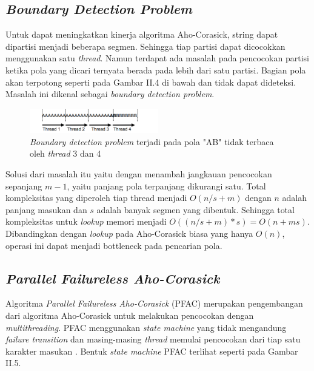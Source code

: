   \subsection {\emph{Boundary Detection Problem}}
    
    Untuk dapat meningkatkan kinerja algoritma Aho-Corasick, string dapat dipartisi menjadi beberapa segmen. Sehingga tiap partisi dapat dicocokkan menggunakan satu \emph{thread}. Namun terdapat ada masalah pada pencocokan partisi ketika pola yang dicari ternyata berada pada lebih dari satu partisi. Bagian pola akan terpotong seperti pada Gambar II.4 di bawah dan tidak dapat dideteksi. Masalah ini dikenal sebagai \emph{boundary detection problem}. 
    
    \begin{figure}[htb]
      \centering
      \includegraphics[width=0.5\textwidth]{resources/boundary.png}
      \caption[\emph{Boundary detection problem} terjadi pada pola "AB" tidak terbaca oleh \emph{thread} 3 dan 4]{\emph{Boundary detection problem} terjadi pada pola "AB" tidak terbaca oleh \emph{thread} 3 dan 4 \citep{lin2013}}
    \end{figure}
    
    Solusi dari masalah itu yaitu dengan menambah jangkauan pencocokan sepanjang $m - 1$, yaitu panjang pola terpanjang dikurangi satu. Total kompleksitas yang diperoleh tiap thread menjadi $O(n/s + m)$ dengan $n$ adalah panjang masukan dan $s$ adalah banyak segmen yang dibentuk. Sehingga total kompleksitas untuk \emph{lookup} memori menjadi $O((n/s + m) * s) = O(n + ms)$. Dibandingkan dengan \emph{lookup} pada Aho-Corasick biasa yang hanya $O(n)$, operasi ini dapat menjadi bottleneck pada pencarian pola.
    

  \subsection {\emph{Parallel Failureless Aho-Corasick}}

    Algoritma \emph{Parallel Failureless Aho-Corasick} (PFAC) merupakan pengembangan dari algoritma Aho-Corasick untuk melakukan pencocokan dengan \emph{multithreading}. PFAC menggunakan \emph{state machine} yang tidak mengandung \emph{failure transition} dan masing-masing \emph{thread} memulai pencocokan dari tiap satu karakter masukan \citep{lin2013}. Bentuk \emph{state machine} PFAC terlihat seperti pada Gambar II.5.

